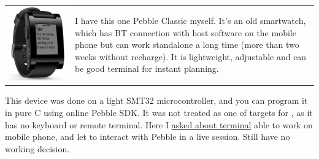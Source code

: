 \ \\

\noindent
\begin{tabular}{l p{}}
\includegraphics[height=0.45\textheight,valign=t]{img/pebble_classic.png}
&
I have this one Pebble Classic myself. It's an old smartwatch, which has BT
connection with host software on the mobile phone but can work standalone a long
time (more than two weeks without recharge). It is lightweight, adjustable and
can be good terminal for instant planning.
\\
\end{tabular}
This device was done on a light SMT32 microcontroller, and you can program it in
pure C using online Pebble SDK. It was not treated as one of targets for \uF, as
it has no keyboard or remote terminal. Here I
\href{https://www.quora.com/unanswered/How-can-I-write-remote-terminal-Android-for-Pebble-Classic-Smartwatch-to-be-able-to-reprogram-it-interactively-I-think-about-full-watch-hosted-Forth-port-or-tiny-bytecode-interpreter-and-compiler-embedded-into-the}{asked
about terminal} able to work on mobile phone, and let to interact with Pebble in
a live session. Still have no working decision.
